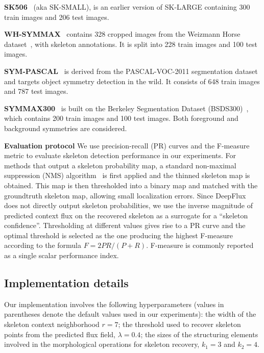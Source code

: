 \documentclass[10pt,twocolumn,letterpaper]{article}
\begin{document}
\medskip

\noindent\textbf{SK506}~\cite{shen2016fsds} (aka SK-SMALL), is an earlier version of SK-LARGE containing 300 train images and 206 test images.

\medskip

\noindent\textbf{WH-SYMMAX}~\cite{shen2016misl} contains 328 cropped images from the Weizmann Horse dataset~\cite{borenstein2002horse}, with skeleton annotations.
It is split into 228 train images and 100 test images.

\medskip

\noindent\textbf{SYM-PASCAL}~\cite{ke2017srn} is derived from the PASCAL-VOC-2011 segmentation dataset~\cite{everingham2010pascalvoc} and targets object symmetry detection in the wild.
It consists of 648 train images and 787 test images.


\medskip

\noindent\textbf{SYMMAX300}~\cite{tsogkas2012mil} is built on the Berkeley Segmentation Dataset (BSDS300)~\cite{martin2001bsds}, which contains 200 train images and 100 test images.
Both foreground and background symmetries are considered.


\medskip

\noindent\textbf{Evaluation protocol}
We use precision-recall (PR) curves and the F-measure metric to evaluate skeleton detection performance in our experiments.
For methods that output a skeleton probability map, a standard non-maximal suppression (NMS) algorithm~\cite{dollar2015nms} is first applied and the thinned skeleton map is obtained.
This map is then thresholded into a binary map and matched with the groundtruth skeleton map, allowing small localization errors.
Since DeepFlux does not directly output skeleton probabilities, we use the inverse magnitude of predicted context flux on the recovered skeleton as a surrogate for a ``skeleton confidence''.
Thresholding at different values gives rise to a PR curve and the optimal threshold is selected as the one producing the highest F-measure according to the formula $F = 2PR/(P+R)$.
F-measure is commonly reported as a single scalar performance index.

\subsection{Implementation details} \label{sec:implementation}
Our implementation involves the following hyperparameters (values in parentheses denote the default values used in our experiments):
the width of the skeleton context neighborhood $r=7$;
the threshold used to recover skeleton points from the predicted flux field, $\lambda=0.4$;
the sizes of the structuring elements involved in the morphological operations for skeleton recovery, $k_1=3$ and $k_2=4$.
\end{document}
